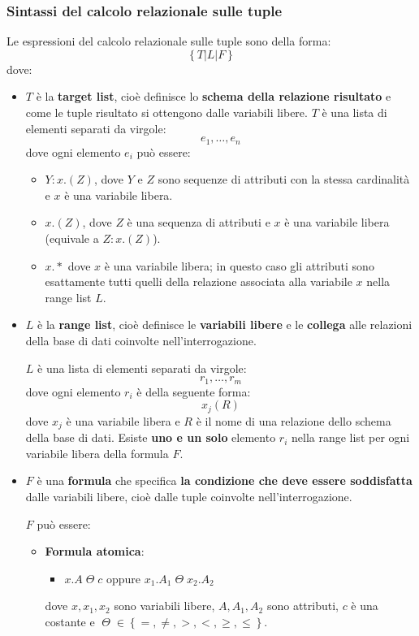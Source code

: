 \documentclass[a4paper,twoside]{article}
\begin{document}
\subsubsection{Sintassi del calcolo relazionale sulle tuple}
Le espressioni del calcolo relazionale sulle tuple sono della forma:
\[
  \left\{ T | L | F \right\}
\] 
dove:
\begin{itemize}
  \item \( T \) è la \textbf{target list}, cioè definisce lo \textbf{schema della relazione
    risultato} e come le tuple risultato si ottengono dalle variabili libere.
    \( T \) è una lista di elementi separati da virgole:
    \[
      e_1, \ldots, e_n
    \] 
    dove ogni elemento \( e_i \) può essere:
    \begin{itemize}
      \item \( Y: x. (Z) \), dove \( Y \) e \( Z \) sono sequenze di attributi con
        la stessa cardinalità e \( x \) è una variabile libera.

      \item \( x. (Z) \), dove \( Z \) è una sequenza di attributi e \( x \)
        è una variabile libera (equivale a \( Z: x.(Z) \)).

      \item \( x.* \) dove \( x \) è una variabile libera; in questo caso gli
        attributi sono esattamente tutti quelli della relazione
        associata alla variabile \( x \) nella range list \( L \).
    \end{itemize}

  \item \( L \) è la \textbf{range list}, cioè definisce le \textbf{variabili libere} e le
    \textbf{collega} alle relazioni della base di dati coinvolte nell'interrogazione.

    \( L \) è una lista di elementi separati da virgole:
    \[
      r_1, \ldots, r_m
    \] 
    dove ogni elemento \( r_i \) è della seguente forma:
    \[
      x_j(R)
    \] 
    dove \( x_j \) è una variabile libera e \( R \) è il nome di una relazione
    dello schema della base di dati.
    Esiste \textbf{uno e un solo} elemento \( r_i \) nella range list per ogni variabile
    libera della formula \( F \).

  \item \( F \) è una \textbf{formula} che specifica \textbf{la condizione che deve essere
    soddisfatta} dalle variabili libere, cioè dalle tuple coinvolte nell'interrogazione.

    \( F \) può essere:
    \begin{itemize}
      \item \textbf{Formula atomica}:
        \begin{itemize}
          \item \( x.A \;\Theta\; c \) oppure  \( x_1.A_1 \;\Theta\; x_2.A_2 \)
        \end{itemize}
        dove \( x, x_1, x_2 \) sono variabili libere, \( A, A_1, A_2 \) sono attributi,
        \( c \) è una costante e \( \;\Theta\; \in \left\{ =, \neq, >, <, \ge, \le  \right\} \).


\end{itemize}
\end{itemize}
\end{document}
